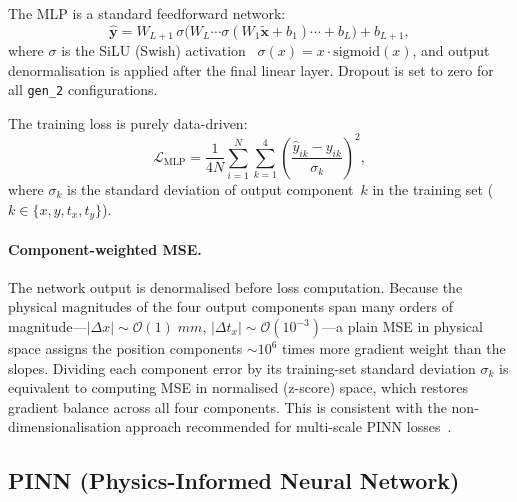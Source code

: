 \documentclass[a4paper,11pt]{article}
\newcommand{\mm}{mm}
\newcommand{\loss}{\mathcal{L}}
\begin{document}
The MLP is a standard feedforward network:
\begin{equation}
  \hat{\mathbf{y}}
  = W_{L+1}\,
    \sigma\!\bigl(W_L \cdots \sigma(W_1 \tilde{\mathbf{x}} + b_1) \cdots + b_L\bigr)
    + b_{L+1},
  \label{eq:mlp}
\end{equation}
where $\sigma$ is the SiLU (Swish) activation~\cite{SiLU}
$\sigma(x) = x \cdot \text{sigmoid}(x)$, and output denormalisation is
applied after the final linear layer.  Dropout is set to zero for all
\texttt{gen\_2} configurations.

The training loss is purely data-driven:
\begin{equation}
  \loss_\text{MLP} = \frac{1}{4N}\sum_{i=1}^{N}\sum_{k=1}^{4}
    \left(\frac{\hat{y}_{ik} - y_{ik}}{\sigma_k}\right)^{\!2},
  \label{eq:loss_mlp}
\end{equation}
where $\sigma_k$ is the standard deviation of output component~$k$ in
the training set ($k \in \{x,y,t_x,t_y\}$).

\paragraph{Component-weighted MSE.}
The network output is denormalised before loss computation.  Because the
physical magnitudes of the four output components span many orders of
magnitude---$|\Delta x| \sim \mathcal{O}(1)\;\mm$, $|\Delta t_x| \sim
\mathcal{O}(10^{-3})$---a plain MSE in physical space assigns the
position components $\sim10^6$ times more gradient weight than the slopes.
Dividing each component error by its training-set standard deviation
$\sigma_k$ is equivalent to computing MSE in normalised (z-score) space,
which restores gradient balance across all four components.  This is
consistent with the non-dimensionalisation approach recommended for
multi-scale PINN losses~\cite{Wang2021,Krishnapriyan2021}.

\subsection{PINN (Physics-Informed Neural Network)}
\label{sec:pinn}
\end{document}
